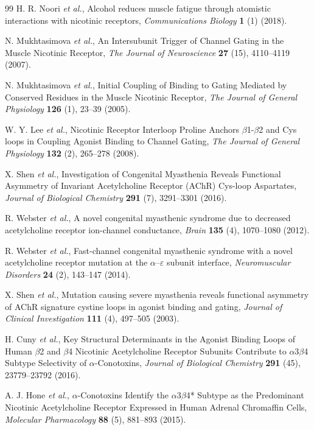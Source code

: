 \documentclass{ws-procs11x85}
\begin{document}
\begin{thebibliography}{99}
H. R. Noori {\em et al.}, Alcohol reduces muscle fatigue through atomistic interactions with nicotinic receptors, {\em Communications Biology} {\bf 1} (1) (2018).

N. Mukhtasimova {\em et al.}, An Intersubunit Trigger of Channel Gating in the Muscle Nicotinic Receptor, {\em The Journal of Neuroscience} {\bf 27} (15), 4110--4119 (2007).

N. Mukhtasimova {\em et al.}, Initial Coupling of Binding to Gating Mediated by Conserved Residues in the Muscle Nicotinic Receptor, {\em The Journal of General Physiology} {\bf 126} (1), 23--39 (2005).

W. Y. Lee {\em et al.}, Nicotinic Receptor Interloop Proline Anchors $\beta$1-$\beta$2 and Cys loops in Coupling Agonist Binding to Channel Gating, {\em The Journal of General Physiology} {\bf 132} (2), 265--278 (2008).

X. Shen {\em et al.}, Investigation of Congenital Myasthenia Reveals Functional Asymmetry of Invariant Acetylcholine Receptor (AChR) Cys-loop Aspartates, {\em Journal of Biological Chemistry} {\bf 291} (7), 3291--3301 (2016).

R. Webster {\em et al.}, A novel congenital myasthenic syndrome due to decreased acetylcholine receptor ion-channel conductance, {\em Brain} {\bf 135} (4), 1070--1080 (2012).

R. Webster {\em et al.}, Fast-channel congenital myasthenic syndrome with a novel acetylcholine receptor mutation at the $\alpha$--$\varepsilon$ subunit interface, {\em Neuromuscular Disorders} {\bf 24} (2), 143--147 (2014).

X. Shen {\em et al.}, Mutation causing severe myasthenia reveals functional asymmetry of AChR signature cystine loops in agonist binding and gating, {\em Journal of Clinical Investigation} {\bf 111} (4), 497--505 (2003).

H. Cuny {\em et al.}, Key Structural Determinants in the Agonist Binding Loops of Human $\beta$2 and $\beta$4 Nicotinic Acetylcholine Receptor Subunits Contribute to $\alpha$3$\beta$4 Subtype Selectivity of $\alpha$-Conotoxins, {\em Journal of Biological Chemistry} {\bf 291} (45), 23779--23792 (2016).

A. J. Hone {\em et al.}, $\alpha$-Conotoxins Identify the $\alpha$3$\beta$4* Subtype as the Predominant Nicotinic Acetylcholine Receptor Expressed in Human Adrenal Chromaffin Cells, {\em Molecular Pharmacology} {\bf 88} (5), 881--893 (2015).


\end{thebibliography}
\end{document}
